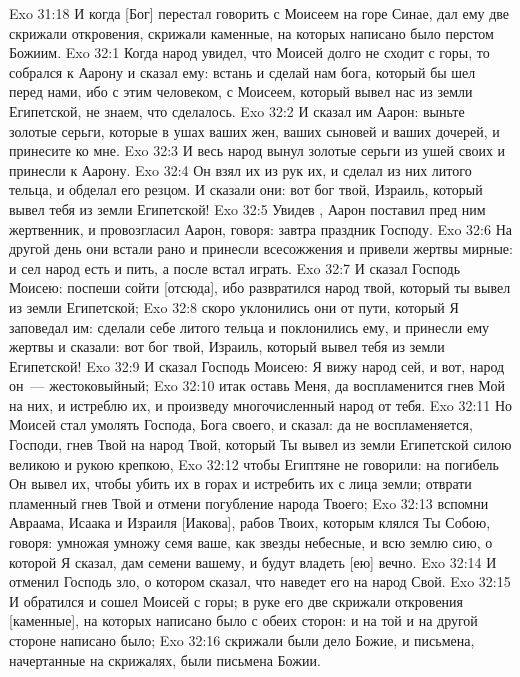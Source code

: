 \rsbpar\vs Exo 31:18 И когда [Бог] перестал говорить с Моисеем на горе Синае, дал ему две скрижали откровения, скрижали каменные, на которых написано было перстом Божиим.
\vs Exo 32:1 Когда народ увидел, что Моисей долго не сходит с горы, то собрался к Аарону и сказал ему: встань и сделай нам бога, который бы шел перед нами, ибо с этим человеком, с Моисеем, который вывел нас из земли Египетской, не знаем, что сделалось.
\vs Exo 32:2 И сказал им Аарон: выньте золотые серьги, которые в ушах ваших жен, ваших сыновей и ваших дочерей, и принесите ко мне.
\vs Exo 32:3 И весь народ вынул золотые серьги из ушей своих и принесли к Аарону.
\vs Exo 32:4 Он взял их из рук их, и сделал из них литого тельца, и обделал его резцом. И сказали они: вот бог твой, Израиль, который вывел тебя из земли Египетской!
\vs Exo 32:5 Увидев , Аарон поставил пред ним жертвенник, и провозгласил Аарон, говоря: завтра праздник Господу.
\vs Exo 32:6 На другой день они встали рано и принесли всесожжения и привели жертвы мирные: и сел народ есть и пить, а после встал играть.
\rsbpar\vs Exo 32:7 И сказал Господь Моисею: поспеши сойти [отсюда], ибо развратился народ твой, который ты вывел из земли Египетской;
\vs Exo 32:8 скоро уклонились они от пути, который Я заповедал им: сделали себе литого тельца и поклонились ему, и принесли ему жертвы и сказали: вот бог твой, Израиль, который вывел тебя из земли Египетской!
\vs Exo 32:9 И сказал Господь Моисею: Я вижу народ сей, и вот, народ он~--- жестоковыйный;
\vs Exo 32:10 итак оставь Меня, да воспламенится гнев Мой на них, и истреблю их, и произведу многочисленный народ от тебя.
\vs Exo 32:11 Но Моисей стал умолять Господа, Бога своего, и сказал: да не воспламеняется, Господи, гнев Твой на народ Твой, который Ты вывел из земли Египетской силою великою и рукою крепкою,
\vs Exo 32:12 чтобы Египтяне не говорили: на погибель Он вывел их, чтобы убить их в горах и истребить их с лица земли; отврати пламенный гнев Твой и отмени погубление народа Твоего;
\vs Exo 32:13 вспомни Авраама, Исаака и Израиля [Иакова], рабов Твоих, которым клялся Ты Собою, говоря: умножая умножу семя ваше, как звезды небесные, и всю землю сию, о которой Я сказал, дам семени вашему, и будут владеть [ею] вечно.
\vs Exo 32:14 И отменил Господь зло, о котором сказал, что наведет его на народ Свой.
\rsbpar\vs Exo 32:15 И обратился и сошел Моисей с горы; в руке его  две скрижали откровения [каменные], на которых написано было с обеих сторон: и на той и на другой стороне написано было;
\vs Exo 32:16 скрижали были дело Божие, и письмена, начертанные на скрижалях, были письмена Божии.
